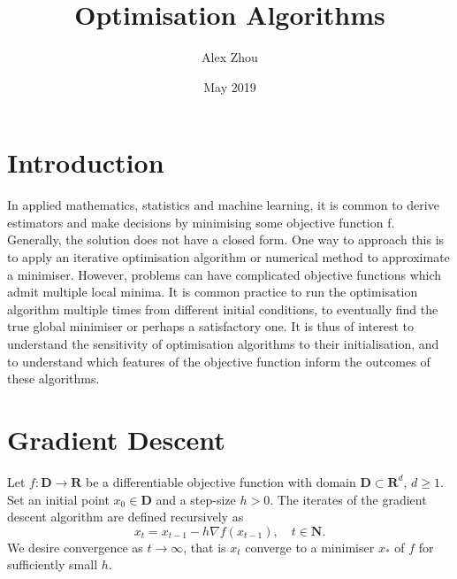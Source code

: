 \documentclass{article}
\title{Optimisation Algorithms}
\author{Alex Zhou}
\date{May 2019}
\begin{document}
\maketitle

\section{Introduction}

In applied mathematics, statistics and machine learning, it is common to derive estimators and make decisions by minimising some objective function f. Generally, the solution does not have a closed form. One way to approach this is to apply an iterative optimisation algorithm or numerical method to approximate a minimiser. However, problems can have complicated objective functions which admit multiple local minima. It is common practice to run the optimisation algorithm
multiple times from different initial conditions, to eventually find the true global minimiser or perhaps a satisfactory one. It is thus of interest to understand the sensitivity of optimisation algorithms to their initialisation, and to understand which features of the objective function inform the outcomes of these algorithms.

\section{Gradient Descent}

Let \(f: \mathbf{D} \to \mathbf{R}\) be a differentiable objective function with domain \(\mathbf{D} \subset \mathbf{R}^d\), \(d \geq 1\). Set an initial point \(x_0 \in \mathbf{D}\) and a step-size \(h > 0\). The iterates of the gradient descent algorithm are defined recursively as
\[ x_t = x_{t-1} - h\nabla f(x_{t-1}), \quad t \in \mathbf{N}. \]
We desire convergence as \(t \to \infty\), that is \(x_t\) converge to a minimiser \(x_*\) of \(f\) for sufficiently small \(h\).
\end{document}

